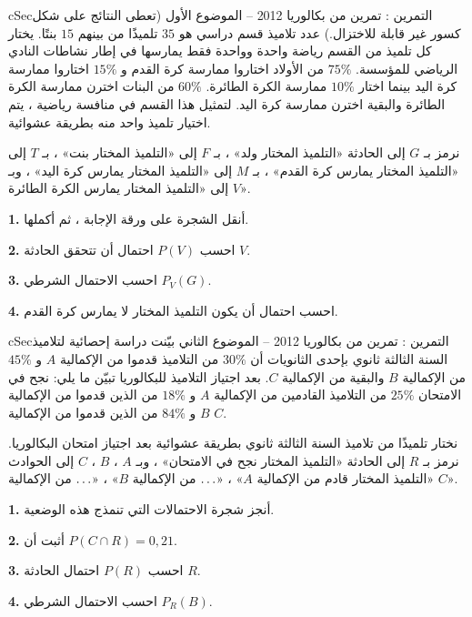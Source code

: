 \documentclass[12pt,a4paper]{article}
\newenvironment{BOX}[2]{\begin{otherlanguage}{english}\begin{arbox}{#1}{#2}}{\end{arbox}\end{otherlanguage}}
\newcounter{exo}
\newenvironment{tamrin}[1]{\stepcounter{exo}\begin{BOX}{cSec}{التمرين \theexo: #1}}{\end{BOX}}
\newenvironment{LTR}{\begin{otherlanguage}{english}}{\end{otherlanguage}}
\renewcommand{\ldots}{\mathinner{\ldotp\ldotp\ldotp}}
\newcommand{\QQ}[1]{\par\smallskip\textbf{#1.} }
\begin{document}
\begin{tamrin}{تمرين من بكالوريا 2012 -- الموضوع الأول}
(تعطى النتائج على شكل كسور غير قابلة للاختزال.) عدد تلاميذ قسم دراسي هو $35$ تلميذًا من بينهم $15$ بنتًا. يختار كل تلميذ من القسم رياضة واحدة وواحدة فقط يمارسها في إطار نشاطات النادي الرياضي للمؤسسة. $75\%$ من الأولاد اختاروا ممارسة كرة القدم و $15\%$ اختاروا ممارسة كرة اليد بينما اختار $10\%$ ممارسة الكرة الطائرة. $60\%$ من البنات اخترن ممارسة الكرة الطائرة والبقية اخترن ممارسة كرة اليد. لتمثيل هذا القسم في منافسة رياضية ، يتم اختيار تلميذ واحد منه بطريقة عشوائية.
\par نرمز بـ $G$ إلى الحادثة «التلميذ المختار ولد» ، بـ $F$ إلى «التلميذ المختار بنت» ، بـ $T$ إلى «التلميذ المختار يمارس كرة القدم» ، بـ $M$ إلى «التلميذ المختار يمارس كرة اليد» ، وبـ $V$ إلى «التلميذ المختار يمارس الكرة الطائرة».
\QQ{1} أنقل الشجرة على ورقة الإجابة ، ثم أكملها.
\QQ{2} احسب $P(V)$ احتمال أن تتحقق الحادثة $V$.
\QQ{3} احسب الاحتمال الشرطي $P_V(G)$.
\QQ{4} احسب احتمال أن يكون التلميذ المختار لا يمارس كرة القدم.
\par\begin{center}\begin{LTR}\end{LTR}\end{center}
\end{tamrin}
\begin{tamrin}{تمرين من بكالوريا 2012 -- الموضوع الثاني}
بيّنت دراسة إحصائية لتلاميذ السنة الثالثة ثانوي بإحدى الثانويات أن $30\%$ من التلاميذ قدموا من الإكمالية $A$ و $45\%$ من الإكمالية $B$ والبقية من الإكمالية $C$. بعد اجتياز التلاميذ للبكالوريا تبيّن ما يلي: نجح في الامتحان $25\%$ من التلاميذ القادمين من الإكمالية $A$ و $18\%$ من الذين قدموا من الإكمالية $B$ و $84\%$ من الذين قدموا من الإكمالية $C$.
\par نختار تلميذًا من تلاميذ السنة الثالثة ثانوي بطريقة عشوائية بعد اجتياز امتحان البكالوريا. نرمز بـ $R$ إلى الحادثة «التلميذ المختار نجح في الامتحان» ، وبـ $A$ ، $B$ ، $C$ إلى الحوادث «التلميذ المختار قادم من الإكمالية $A$» ، «$\ldots$ من الإكمالية $B$» ، «$\ldots$ من الإكمالية $C$».
\QQ{1} أنجز شجرة الاحتمالات التي تنمذج هذه الوضعية.
\QQ{2} أثبت أن $P(C\cap R)=0{,}21$.
\QQ{3} احسب $P(R)$ احتمال الحادثة $R$.
\QQ{4} احسب الاحتمال الشرطي $P_R(B)$.
\end{tamrin}
\end{document}
